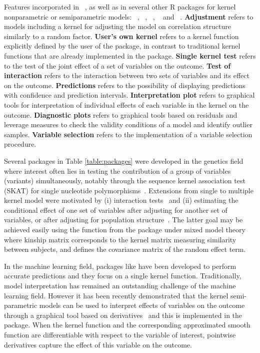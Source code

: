 \begin{table}[htbp]
\begin{center}
\caption{\label{table:packages} Features incorporated in ~\citep{schrammPackage}, as well as in several other R packages for kernel nonparametric or semiparametric models: ~\citep{coxmeTherneau}, ~\citep{SKATLee}, ~\citep{KRLSpackageR}, ~\citep{e1071} and ~\citep{SPA3GLi}. \textbf{Adjustment} refers to models including a kernel for adjusting the model on correlation structure similarly to a random factor. \textbf{User's own kernel} refers to a kernel function explicitly defined by the user of the package, in contrast to traditional kernel functions that are already implemented in the package. \textbf{Single kernel test} refers to the test of the joint effect of a set of variables on the outcome. \textbf{Test of interaction} refers to the interaction between two sets of variables and its effect on the outcome. \textbf{Predictions} refers to the possibility of displaying predictions with confidence and prediction intervals. \textbf{Interpretation plot} refers to graphical tools for interpretation of individual effects of each variable in the kernel on the outcome. \textbf{Diagnostic plots} refers to graphical tools based on residuals and leverage measures to check the validity conditions of a model and identify outlier samples. \textbf{Variable selection} refers to the implementation of a variable selection procedure.} 
\end{center}
\end{table}


Several packages in Table \ref{table:packages} were developed in the genetics field where interest often lies in testing the contribution of a group of variables (variants) simultaneously, notably through the sequence kernel association test (SKAT) for single nucleotide polymorphisms~\citep{wu2011rare, chen2016small}. Extensions from single to multiple kernel model were motivated by (i) interaction tests~\citep{li2012gene, wang2017set, ge2015kernel, marceau2015fast} and (ii) estimating the conditional effect of one set of variables after adjusting for another set of variables, or after adjusting for population structure~\citep{oualkacha2013adjusted}. The latter goal may be achieved easily using the  function from the  package under mixed model theory where kinship matrix corresponds to the kernel matrix measuring similarity between subjects, and defines the covariance matrix of the random effect term. 


In the machine learning field, packages like  have been developed to perform accurate predictions and they focus on a single kernel function. Traditionally, model interpretation has remained an outstanding challenge of the machine learning field. However it has been recently demonstrated that the kernel semi-parametric models can be used to interpret effects of variables on the outcome through a graphical tool based on derivatives~\citep{hainmueller2013kernel} and this is implemented in the  package. When the kernel function and the corresponding approximated smooth function are differentiable with respect to the variable of interest, pointwise derivatives capture the effect of this variable on the outcome. 

